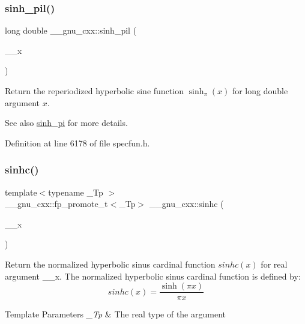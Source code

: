 \subsubsection{\texorpdfstring{sinh\+\_\+pil()}{sinh\_pil()}}
{\footnotesize\ttfamily long double \+\_\+\+\_\+gnu\+\_\+cxx\+::sinh\+\_\+pil (\begin{DoxyParamCaption}\item[{long double}]{\+\_\+\+\_\+x }\end{DoxyParamCaption})\hspace{0.3cm}{\ttfamily [inline]}}

Return the reperiodized hyperbolic sine function $ \sinh_\pi(x) $ for {\ttfamily long double} argument $ x $.

\begin{DoxySeeAlso}{See also}
\hyperlink{group__gnu__math__spec__func_gade43453b87b6b38c05b3fcce40870542}{sinh\+\_\+pi} for more details. 
\end{DoxySeeAlso}


Definition at line 6178 of file specfun.\+h.

\mbox{\label{group__gnu__math__spec__func_gaf2f02e4143e7beb97352cef4b7fcb663}} 
\subsubsection{\texorpdfstring{sinhc()}{sinhc()}}
{\footnotesize\ttfamily template$<$typename \+\_\+\+Tp $>$ \\
\+\_\+\+\_\+gnu\+\_\+cxx\+::fp\+\_\+promote\+\_\+t$<$\+\_\+\+Tp$>$ \+\_\+\+\_\+gnu\+\_\+cxx\+::sinhc (\begin{DoxyParamCaption}\item[{\+\_\+\+Tp}]{\+\_\+\+\_\+x }\end{DoxyParamCaption})\hspace{0.3cm}{\ttfamily [inline]}}

Return the normalized hyperbolic sinus cardinal function $ sinhc(x) $ for real argument {\ttfamily \+\_\+\+\_\+x}. The normalized hyperbolic sinus cardinal function is defined by\+: \[ sinhc(x) = \frac{\sinh(\pi x)}{\pi x} \]


\begin{DoxyTemplParams}{Template Parameters}
{\em \+\_\+\+Tp} & The real type of the argument \\
\hline
\end{DoxyTemplParams}

